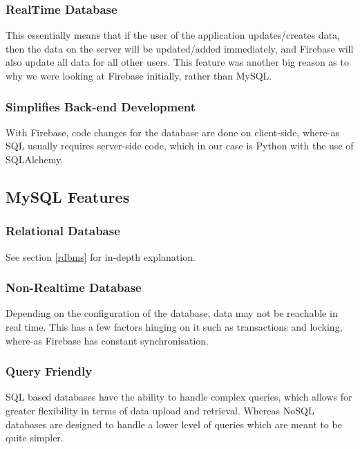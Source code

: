 \subsubsection{RealTime Database}
This essentially means that if the user of the application updates/creates data, then the data on the server will be updated/added immediately, and Firebase will also update all data for all other users. This feature was another big reason as to why we were looking at Firebase initially, rather than MySQL.
\subsubsection{Simplifies Back-end Development}
With Firebase, code changes for the database are done on client-side, where-as SQL usually requires server-side code, which in our case is Python with the use of SQLAlchemy.

\subsection{MySQL Features}
\subsubsection{Relational Database}
See section \ref{rdbms} for in-depth explanation.
\subsubsection{Non-Realtime Database}
Depending on the configuration of the database, data may not be reachable in real time. This has a few factors hinging on it such as transactions and locking, where-as Firebase has constant synchronisation.
\subsubsection{Query Friendly}
SQL based databases have the ability to handle complex queries, which allows for greater flexibility  in terms of data upload and retrieval. Whereas NoSQL databases are designed to handle a lower level of queries which are meant to be quite simpler. 